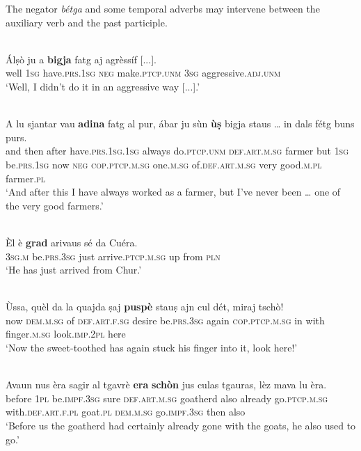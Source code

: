 The negator \textit{bétga} and some temporal adverbs may intervene between the auxiliary verb and the past participle.

\ea\label{}
\\
\gll  Álṣò ju a \textbf{bigja} fatg aj agrèssíf [...].  \\
well \textsc{1sg} have.\textsc{prs.1sg} \textsc{neg} make.\textsc{ptcp.unm} \textsc{3sg} aggressive.\textsc{adj.unm}\\
\glt `Well, I didn’t do it in an aggressive way [...].'
\z

\ea\label{}
\\
\gll    A lu sjantar vau \textbf{adina} fatg al pur, ábar ju sùn \textbf{ùṣ} bigja staus … in dals fétg buns purs.\\
and then after have.\textsc{prs.1sg.1sg} always do.\textsc{ptcp.unm} \textsc{def.art.m.sg} farmer but  \textsc{1sg} be.\textsc{prs.1sg} now \textsc{neg} \textsc{cop.ptcp.m.sg} {} one.\textsc{m.sg} of.\textsc{def.art.m.sg} very good.\textsc{m.pl} farmer.\textsc{pl}\\
\glt `And after this I have always worked as a farmer, but I’ve never been … one of the very good farmers.'
\z

\ea
\label{}
\\
\gll Èl è \textbf{grad} arivaus sé da Cuéra.\\
\textsc{3sg.m} be.\textsc{prs.3sg} just arrive.\textsc{ptcp.m.sg} up from \textsc{pln}\\
\glt `He has just arrived from Chur.'
\z

\ea\label{}
\\
\gll Ùssa, quèl da la quajda ṣaj \textbf{puspè} stauṣ ajn cul dét, miraj tschò!\\
   now \textsc{dem.m.sg} of \textsc{def.art.f.sg} desire be.\textsc{prs.3sg} again \textsc{cop.ptcp.m.sg} in with finger.\textsc{m.sg} look.\textsc{imp.2pl} here\\
\glt `Now the sweet-toothed has again stuck his finger into it, look here!'
\z

\ea
\label{}
\\
\gll    Avaun nus èra sagir al tgavrè \textbf{era} \textbf{schòn} jus culas tgauras, lèz mava lu èra.\\
before \textsc{1pl} be.\textsc{impf.3sg} sure \textsc{def.art.m.sg} goatherd also already go.\textsc{ptcp.m.sg} with.\textsc{def.art.f.pl} goat.\textsc{pl} \textsc{dem.m.sg} go.\textsc{impf.3sg} then also\\
\glt `Before us the goatherd had certainly already gone with the goats, he also used to go.'
\z


